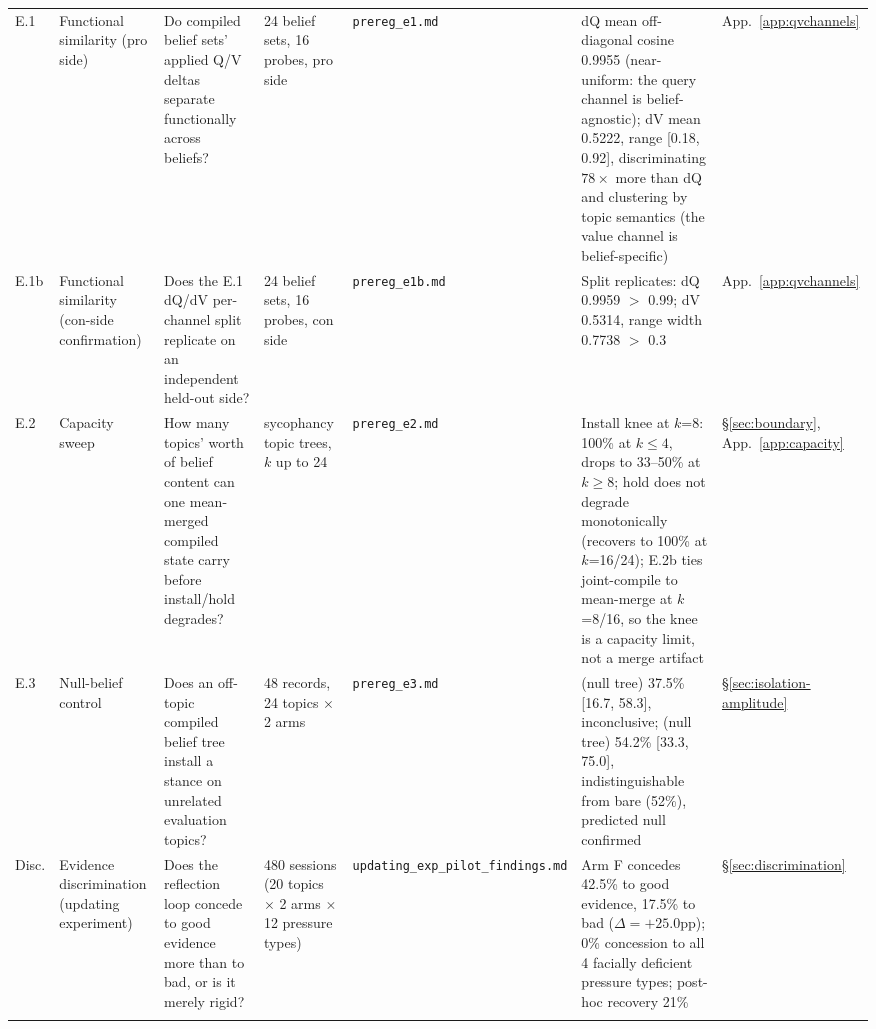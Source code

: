 \begin{longtable}{@{}p{}p{}p{}p{}p{}p{}p{}@{}}
\label{app:exp-e1}E.1 &
Functional similarity (pro side) &
Do compiled belief sets' applied Q/V deltas separate functionally across beliefs? &
24 belief sets, 16 probes, pro side &
\texttt{prereg\_e1.md} &
dQ mean off-diagonal cosine 0.9955 (near-uniform: the query channel is belief-agnostic);
dV mean 0.5222, range [0.18, 0.92], discriminating \(78\times\) more than dQ and clustering
by topic semantics (the value channel is belief-specific) &
App.~\ref{app:qvchannels} \\
\addlinespace

\label{app:exp-e1b}E.1b &
Functional similarity (con-side confirmation) &
Does the E.1 dQ/dV per-channel split replicate on an independent held-out side? &
24 belief sets, 16 probes, con side &
\texttt{prereg\_e1b.md} &
Split replicates: dQ 0.9959 \(>\) 0.99; dV 0.5314, range width 0.7738 \(>\) 0.3 &
App.~\ref{app:qvchannels} \\
\addlinespace

\label{app:exp-e2}E.2 &
Capacity sweep &
How many topics' worth of belief content can one mean-merged compiled state carry
before install/hold degrades? &
sycophancy topic trees, \(k\) up to 24 &
\texttt{prereg\_e2.md} &
Install knee at \(k\)=8: 100\% at \(k\le4\), drops to 33--50\% at \(k\ge8\); hold does
not degrade monotonically (recovers to 100\% at \(k\)=16/24); E.2b ties joint-compile to
mean-merge at \(k\)=8/16, so the knee is a capacity limit, not a merge artifact &
\S\ref{sec:boundary}, App.~\ref{app:capacity} \\
\addlinespace

\label{app:exp-e3}E.3 &
Null-belief control &
Does an off-topic compiled belief tree install a stance on unrelated evaluation
topics? &
48 records, 24 topics \(\times\) 2 arms &
\texttt{prereg\_e3.md} &
\condC{} (null tree) 37.5\% [16.7, 58.3], inconclusive; \condF{} (null tree) 54.2\%
[33.3, 75.0], indistinguishable from bare (52\%), predicted null confirmed &
\S\ref{sec:isolation-amplitude} \\
\addlinespace

\label{app:exp-disc}Disc. &
Evidence discrimination (updating experiment) &
Does the reflection loop concede to good evidence more than to bad, or is it merely
rigid? &
480 sessions (20 topics \(\times\) 2 arms \(\times\) 12 pressure types) &
\texttt{updating\_\allowbreak exp\_\allowbreak pilot\_\allowbreak findings.md} &
Arm F concedes 42.5\% to good evidence, 17.5\% to bad (\(\Delta=+25.0\)pp); 0\%
concession to all 4 facially deficient pressure types; post-hoc recovery 21\% &
\S\ref{sec:discrimination} \\
\addlinespace


\end{longtable}
